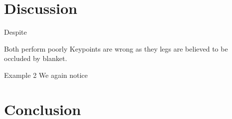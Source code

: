 \chapter{Discussion}



Despite 



Both perform poorly
Keypoints are wrong as they legs are believed to be occluded by blanket.


Example 2
We again notice 


\chapter{Conclusion}
